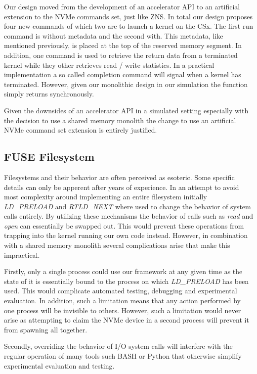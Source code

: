 Our design moved from the development of an accelerator API to an artificial
extension to the NVMe commands set, just like ZNS. In total our design proposes
four new commands of which two are to launch a kernel on the CSx. The first
run command is without metadata and the second with. This metadata, like
mentioned previously, is placed at the top of the reserved memory segment. In
addition, one command is used to retrieve the return data from a terminated
kernel while they other retrieves read / write statistics. In a practical
implementation a so called completion command will signal when a kernel has
terminated. However, given our monolithic design in our simulation the function
simply returns synchronously.

Given the downsides of an accelerator API in a simulated setting especially
with the decision to use a shared memory monolith the change to use an
artificial NVMe command set extension is entirely justified.

\subsection{FUSE Filesystem}

Filesystems and their behavior are often perceived as esoteric. Some specific
details can only be apperent after years of experience. In an attempt to avoid
most complexity around implementing an entire filesystem initially
\textit{LD\_PRELOAD} and \textit{RTLD\_NEXT} where used to change the behavior
of system calls entirely. By utilizing these mechanisms the behavior of calls
such as \textit{read} and \textit{open} can essentially be swapped out. This
would prevent these operations from trapping into the kernel running our own
code instead. However, in combination with a shared memory monolith several
complications arise that make this impractical.

Firstly, only a single process could use our framework at any given time as the
state of it is essentially bound to the process on which \textit{LD\_PRELOAD}
has been used. This would complicate automated testing, debugging and
experimental evaluation. In addition, such a limitation means that any action
performed by one process will be invisible to others. However, such a limitation
would never arise as attempting to claim the NVMe device in a second process
will prevent it from spawning all together.

Secondly, overriding the behavior of I/O system calls will interfere with the
regular operation of many tools such BASH or Python that otherwise simplify
experimental evaluation and testing.

